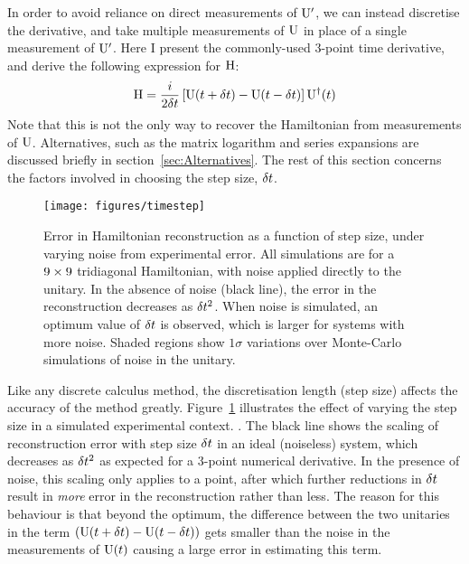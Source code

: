 In order to avoid reliance on direct measurements of \(\mathrm{U}^{\prime}\), we
can instead discretise the derivative, and take multiple measurements of
\(\mathrm{U}\) in place of a single measurement of \(\mathrm{U}^{\prime}\). Here I
present the commonly-used 3-point time derivative, and derive the following
expression for \(\mathrm{H}\):
\begin{equation}
  \label{eq:hamiltomo}
  \mathrm{H} = \frac{i}{2 \delta t} \left[ \mathrm{U} \!\left(t+\delta t\right) - \mathrm{U} \!\left(t-\delta t\right)
  \right] \mathrm{U}^{\dagger} \!\left(t\right)
\end{equation}
Note that this is not the only way to recover the Hamiltonian from measurements
of \(\mathrm{U}\). Alternatives, such as the matrix logarithm and series expansions
are discussed briefly in section~\ref{sec:Alternatives}. The rest of this
section concerns the factors involved in choosing the step size, \(\delta t\).

\begin{figure}[h]
  \centering
  \texttt{[image: figures/timestep]}
  \caption[Error in Hamiltonian reconstruction as a function of step size]
  {Error in Hamiltonian reconstruction as a function of step size, under varying
  noise from experimental error. All simulations are for a \(9 \times 9\)
  tridiagonal Hamiltonian, with noise applied directly to the unitary.
  In the absence of noise (black line), the error in the
  reconstruction decreases as \(\delta t^{2}\). When noise is simulated, an optimum
  value of \(\delta t\) is observed, which is larger for systems with more noise.
  Shaded regions show \(1 \sigma\) variations over Monte-Carlo simulations of
  noise in the unitary.}
  \label{fig:stepsize}
\end{figure}

Like any discrete calculus method, the discretisation length (step size) affects
the accuracy of the method greatly. Figure~\ref{fig:stepsize} illustrates the
effect of varying the step size in a simulated experimental context.
. The black line shows the
scaling of reconstruction error with step size \(\delta t\) in an ideal (noiseless)
system, which decreases as \(\delta t^{2}\) as expected for a 3-point numerical
derivative. In the presence of noise, this scaling only applies to a point,
after which further reductions in \(\delta t\) result in \emph{more} error in the
reconstruction rather than less. The reason for this behaviour is that beyond
the optimum, the difference between the two unitaries in the term \(\left(
\mathrm{U} \!\left(t+\delta t\right) - \mathrm{U} \!\left(t-\delta t\right) \right)\) gets smaller than the noise
in the measurements of \(\mathrm{U} \!\left(t\right)\) causing a large error in estimating
this term.


